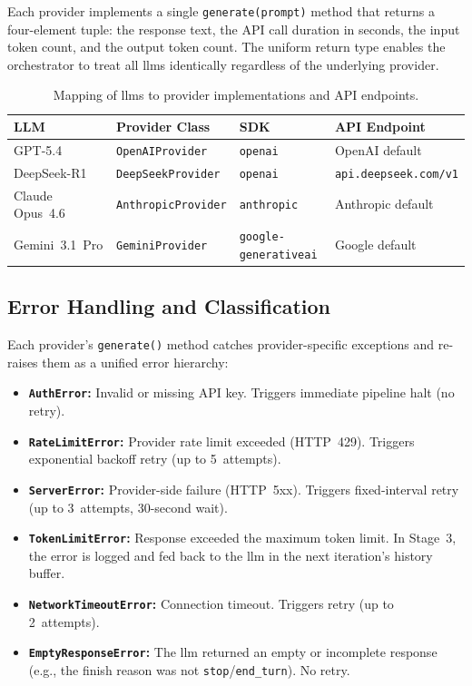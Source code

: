 Each provider implements a single \texttt{generate(prompt)} method that returns a four-element tuple: the response text, the API call duration in seconds, the input token count, and the output token count.
The uniform return type enables the orchestrator to treat all \glspl{llm} identically regardless of the underlying provider.

\begin{table}[htbp]
  \centering
  \caption{Mapping of \glspl{llm} to provider implementations and API endpoints.}
  \label{tab:llm_mapping}
  \small
  \begin{tabular}{l l l l}
    \toprule
    \textbf{LLM} & \textbf{Provider Class} & \textbf{SDK} & \textbf{API Endpoint} \\
    \midrule
    GPT-5.4 & \texttt{OpenAIProvider} & \texttt{openai} & OpenAI default \\
    DeepSeek-R1 & \texttt{DeepSeekProvider} & \texttt{openai} & \texttt{api.deepseek.com/v1} \\
    Claude Opus~4.6 & \texttt{AnthropicProvider} & \texttt{anthropic} & Anthropic default \\
    Gemini~3.1~Pro & \texttt{GeminiProvider} & \texttt{google-generativeai} & Google default \\
    \bottomrule
  \end{tabular}
\end{table}

\subsection{Error Handling and Classification}
\label{sec:impl:llm:errors}

Each provider's \texttt{generate()} method catches provider-specific exceptions and re-raises them as a unified error hierarchy:

\begin{itemize}
  \item \textbf{\texttt{AuthError}:} Invalid or missing API key. Triggers immediate pipeline halt (no retry).
  \item \textbf{\texttt{RateLimitError}:} Provider rate limit exceeded (HTTP~429). Triggers exponential backoff retry (up to 5~attempts).
  \item \textbf{\texttt{ServerError}:} Provider-side failure (HTTP~5xx). Triggers fixed-interval retry (up to 3~attempts, 30-second wait).
  \item \textbf{\texttt{TokenLimitError}:} Response exceeded the maximum token limit. In Stage~3, the error is logged and fed back to the \gls{llm} in the next iteration's history buffer.
  \item \textbf{\texttt{NetworkTimeoutError}:} Connection timeout. Triggers retry (up to 2~attempts).
  \item \textbf{\texttt{EmptyResponseError}:} The \gls{llm} returned an empty or incomplete response (e.g., the finish reason was not \texttt{stop}/\texttt{end\_turn}). No retry.
\end{itemize}

